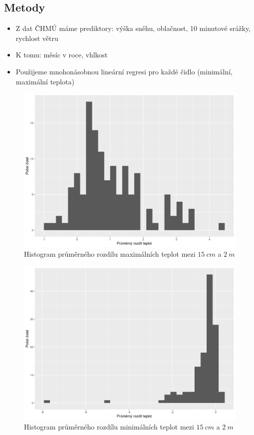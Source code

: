\documentclass[
	11pt, %
]{beamer}
\begin{document}
\subsection{Metody}

\begin{frame}
	\begin{itemize}
		\item Z dat ČHMÚ máme prediktory: výška sněhu, oblačnost, 10 minutové srážky, rychlost větru
	
\item K tomu: měsíc v roce, vhlkost

\item Použijeme mnohonásobnou lineární regresi pro každé čidlo (minimální, maximální teplota)
	\end{itemize}
\end{frame}

\begin{frame}
	\begin{figure}
		\includegraphics[width=0.8\linewidth,height=0.6\textwidth]{hist.png}
		\caption{Histogram průměrného rozdílu maximálních teplot mezi $\SI{15}{cm}$ a $\SI{2}{m}$}
	\end{figure}
\end{frame}

\begin{frame}
	\begin{figure}
		\includegraphics[width=0.8\linewidth,height=0.6\textwidth]{hist2.png}
		\caption{Histogram průměrného rozdílu minimálních teplot mezi $\SI{15}{cm}$ a $\SI{2}{m}$}
	\end{figure}
\end{frame}
\end{document}
